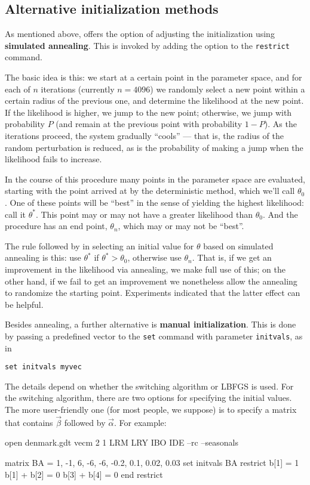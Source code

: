 \subsection{Alternative initialization methods}
\label{sec:vecm-alt-init}

As mentioned above,  offers the option of adjusting the
initialization using \textbf{simulated annealing}.  This is invoked by
adding the  option to the \texttt{restrict} command.

The basic idea is this: we start at a certain point in the parameter
space, and for each of $n$ iterations (currently $n=4096$) we randomly
select a new point within a certain radius of the
previous one, and determine the likelihood at the new point.  If the
likelihood is higher, we jump to the new point; otherwise, we jump
with probability $P$ (and remain at the previous point with
probability $1-P$).  As the iterations proceed, the system gradually
``cools'' --- that is, the radius of the random perturbation is
reduced, as is the probability of making a jump when the likelihood
fails to increase.

In the course of this procedure many points in the parameter space are
evaluated, starting with the point arrived at by the deterministic
method, which we'll call $\theta_0$.  One of these points will be
``best'' in the sense of yielding the highest likelihood: call it
$\theta^*$.  This point may or may not have a greater likelihood than
$\theta_0$.  And the procedure has an end point, $\theta_n$, which may
or may not be ``best''.

The rule followed by  in selecting an initial value for $\theta$
based on simulated annealing is this: use $\theta^*$ if $\theta^* >
\theta_0$, otherwise use $\theta_n$.  That is, if we get an
improvement in the likelihood via annealing, we make full use of this;
on the other hand, if we fail to get an improvement we nonetheless
allow the annealing to randomize the starting point.  Experiments
indicated that the latter effect can be helpful.

Besides annealing, a further alternative is \textbf{manual
  initialization}.  This is done by passing a predefined vector to the
\texttt{set} command with parameter \texttt{initvals}, as in
%
\begin{verbatim}
set initvals myvec
\end{verbatim}

The details depend on whether the switching algorithm or LBFGS is
used.  For the switching algorithm, there are two options for
specifying the initial values.  The more user-friendly one (for most
people, we suppose) is to specify a matrix that contains $\vec{\beta}$
followed by $\vec{\alpha}$. For example:
\begin{code}
open denmark.gdt
vecm 2 1 LRM LRY IBO IDE --rc --seasonals

matrix BA = {1, -1, 6, -6, -6, -0.2, 0.1, 0.02, 0.03}
set initvals BA
restrict
  b[1] = 1
  b[1] + b[2] = 0
  b[3] + b[4] = 0
end restrict
\end{code}

